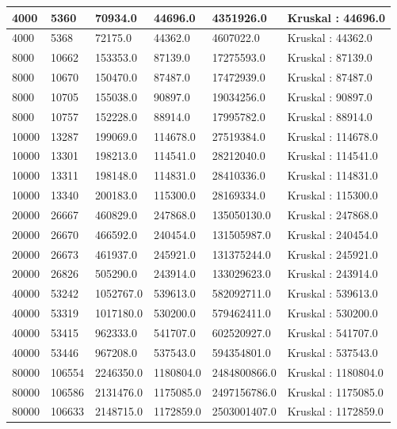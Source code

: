 \begin{longtable}[H]{|p{1.5cm}|p{1.5cm}|p{2cm}|p{2cm}|p{3cm}|p{3cm}|}
    4000 & 5360 & 70934.0 & 44696.0 & 4351926.0 & Kruskal : 44696.0 \\ \hline 
    4000 & 5368 & 72175.0 & 44362.0 & 4607022.0 & Kruskal : 44362.0 \\ \hline 
    8000 & 10662 & 153353.0 & 87139.0 & 17275593.0 & Kruskal : 87139.0 \\ \hline
    8000 & 10670 & 150470.0 & 87487.0 & 17472939.0 & Kruskal : 87487.0 \\ \hline
    8000 & 10705 & 155038.0 & 90897.0 & 19034256.0 & Kruskal : 90897.0 \\ \hline
    8000 & 10757 & 152228.0 & 88914.0 & 17995782.0 & Kruskal : 88914.0 \\ \hline
    10000 & 13287 & 199069.0 & 114678.0 & 27519384.0 & Kruskal : 114678.0 \\ \hline 
    10000 & 13301 & 198213.0 & 114541.0 & 28212040.0 & Kruskal : 114541.0 \\ \hline 
    10000 & 13311 & 198148.0 & 114831.0 & 28410336.0 & Kruskal : 114831.0 \\ \hline 
    10000 & 13340 & 200183.0 & 115300.0 & 28169334.0 & Kruskal : 115300.0 \\ \hline 
    20000 & 26667 & 460829.0 & 247868.0 & 135050130.0 & Kruskal : 247868.0 \\ \hline
    20000 & 26670 & 466592.0 & 240454.0 & 131505987.0 & Kruskal : 240454.0 \\ \hline
    20000 & 26673 & 461937.0 & 245921.0 & 131375244.0 & Kruskal : 245921.0 \\ \hline
    20000 & 26826 & 505290.0 & 243914.0 & 133029623.0 & Kruskal : 243914.0 \\ \hline
    40000 & 53242 & 1052767.0 & 539613.0 & 582092711.0 & Kruskal : 539613.0 \\ \hline 
    40000 & 53319 & 1017180.0 & 530200.0 & 579462411.0 & Kruskal : 530200.0 \\ \hline 
    40000 & 53415 & 962333.0 & 541707.0 & 602520927.0 & Kruskal : 541707.0 \\ \hline 
    40000 & 53446 & 967208.0 & 537543.0 & 594354801.0 & Kruskal : 537543.0 \\ \hline 
    80000 & 106554 & 2246350.0 & 1180804.0 & 2484800866.0 & Kruskal : 1180804.0 \\ \hline
    80000 & 106586 & 2131476.0 & 1175085.0 & 2497156786.0 & Kruskal : 1175085.0 \\ \hline
    80000 & 106633 & 2148715.0 & 1172859.0 & 2503001407.0 & Kruskal : 1172859.0 \\ \hline

\end{longtable}
